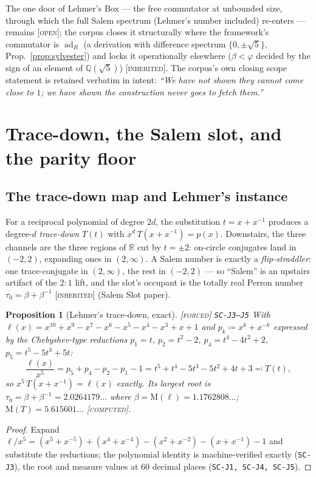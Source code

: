 \documentclass[11pt]{article}
\newcommand{\tagF}{\textcolor{cF}{\textsc{[forced]}}}
\newcommand{\tagC}{\textcolor{cC}{\textsc{[computed]}}}
\newcommand{\tagI}{\textcolor{cI}{\textsc{[inherited]}}}
\newcommand{\tagO}{\textcolor{cO}{\textsc{[open]}}}
\newcommand{\hx}[1]{\textcolor{cC}{\footnotesize\texttt{#1}}}
\newcommand{\Q}{\mathbb{Q}}
\newcommand{\R}{\mathbb{R}}
\newcommand{\gp}{\varphi}
\newcommand{\M}{\mathrm{M}}
\newcommand{\adR}{\operatorname{ad}_R}
\theoremstyle{plain}
\newtheorem{proposition}[theorem]{Proposition}
\theoremstyle{definition}
\theoremstyle{remark}
\begin{document}
The one door of Lehmer's Box --- the free commutator at unbounded size, through which
the full Salem spectrum (Lehmer's number included) re-enters --- remains \tagO{};
the corpus closes it structurally where the framework's commutator is $\adR$ (a
derivation with difference spectrum $\{0,\pm\sqrt5\}$, Prop.~\ref{prop:sylvester}) and
locks it operationally elsewhere ($\beta<\gp$ decided by the sign of an element of
$\Q(\sqrt5)$) \tagI{}. The corpus's own closing scope statement is retained verbatim
in intent: \emph{``We have not shown they cannot come close to $1$; we have shown the
construction never goes to fetch them.''}

\section{Trace-down, the Salem slot, and the parity floor}\label{sec:tracedown}

\subsection{The trace-down map and Lehmer's instance}
For a reciprocal polynomial of degree $2d$, the substitution $t=x+x^{-1}$ produces a
degree-$d$ \emph{trace-down} $T(t)$ with $x^d\,T(x+x^{-1})=p(x)$. Downstairs, the three
channels are the three regions of $\R$ cut by $t=\pm2$: on-circle conjugates land in
$(-2,2)$, expanding ones in $(2,\infty)$. A Salem number is exactly a
\emph{flip-straddler}: one trace-conjugate in $(2,\infty)$, the rest in $(-2,2)$ ---
so ``Salem'' is an upstairs artifact of the $2{:}1$ lift, and the slot's occupant is
the totally real Perron number $\tau_0=\beta+\beta^{-1}$ \tagI{} (Salem Slot paper).

\begin{proposition}[Lehmer's trace-down, exact]\label{prop:lehmertrace}\tagF{} \hx{SC-J3--J5}
With $\ell(x)=x^{10}+x^9-x^7-x^6-x^5-x^4-x^3+x+1$ and
$p_k \coloneqq x^k+x^{-k}$ expressed by the Chebyshev-type reductions
$p_1=t$, $p_2=t^2-2$, $p_4=t^4-4t^2+2$, $p_5=t^5-5t^3+5t$:
\[
\frac{\ell(x)}{x^5}=p_5+p_4-p_2-p_1-1
=t^5+t^4-5t^3-5t^2+4t+3 \eqqcolon T(t),
\]
so $x^5\,T(x+x^{-1})=\ell(x)$ exactly. Its largest root is
$\tau_0=\beta+\beta^{-1}=2.0264179\ldots$ where $\beta=\M(\ell)=1.1762808\ldots$;
$\M(T)=5.615601\ldots$ \tagC{}.
\end{proposition}

\begin{proof}
Expand $\ell/x^5=(x^5+x^{-5})+(x^4+x^{-4})-(x^2+x^{-2})-(x+x^{-1})-1$ and substitute
the reductions; the polynomial identity is machine-verified exactly (\hx{SC-J3}), the
root and measure values at 60 decimal places (\hx{SC-J1, SC-J4, SC-J5}).
\end{proof}
\end{document}
